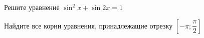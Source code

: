 \begin{ex}
	\begin{condition}
		\begin{enumcols}[label=\asbuk*)]
			\item Решите уравнение \( \sin^2 x + \sin 2x = 1 \)
			\item Найдите все корни уравнения, принадлежащие отрезку \( \left[-\pi;\dfrac{\pi}{2}\right] \)
		\end{enumcols}
	\end{condition}
\end{ex}